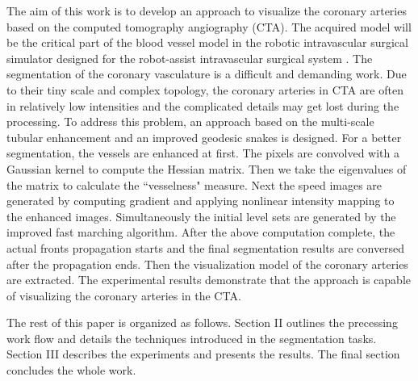 The aim of this work is to develop an approach to visualize the coronary arteries based on the computed tomography angiography (CTA).
The acquired model will be the critical part of the blood vessel model in the robotic intravascular surgical simulator designed for the robot-assist intravascular surgical system \cite{Ji2011EMBC}.
The segmentation of the coronary vasculature is a difficult and demanding work.
Due to their tiny scale and complex topology, the coronary arteries in CTA are often in relatively low intensities and the complicated details may get lost during the processing.
To address this problem, an approach based on the multi-scale tubular enhancement and an improved geodesic snakes is designed.
For a better segmentation, the vessels are enhanced at first.
The pixels are convolved with a Gaussian kernel to compute the Hessian matrix.
Then we take the eigenvalues of the matrix to calculate the ``vesselness" measure.
Next the speed images are generated by computing gradient and applying nonlinear intensity mapping to the enhanced images.
Simultaneously the initial level sets are generated by the improved fast marching algorithm.
After the above computation complete, the actual fronts propagation starts and the final segmentation results are conversed after the propagation ends.
Then the visualization model of the coronary arteries are extracted.
The experimental results demonstrate that the approach is capable of visualizing the coronary arteries in the CTA.

The rest of this paper is organized as follows.
Section II outlines the precessing work flow and details the techniques introduced in the segmentation tasks.
Section III describes the experiments and presents the results.
The final section concludes the whole work. 